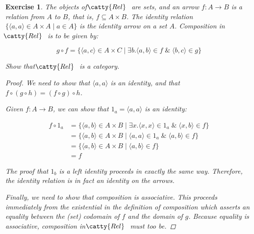 \documentclass[]{article}
\newtheorem{exercise}{Exercise}
\newcommand{\tfarr}[4][\to]{\ensuremath{#2 : #3 #1 #4}}
\newcommand{\cat}[1]{\ensuremath{\!\! \catty{#1} \,\,}}
\begin{document}
\begin{exercise}
  The objects of \cat{Rel} are sets, and an arrow \tfarr{f}{A}{B} is a relation
  from $A$ to $B$, that is, $f \subseteq A \times B$. The identity relation
  $\{\langle a, a\rangle \in A \times A \;|\; a \in A\}$ is the identity arrow
  on a set $A$.  Composition in \cat{Rel} is to be given by:

  $$
  g \circ f = \{\langle a, c\rangle \in A \times C \;|\; \exists b. \langle a,b
  \rangle \in f \;\&\; \langle b, c \rangle \in g\}
  $$

  Show that \cat{Rel} is a category.

  \begin{proof}
    We need to show that $\langle a, a\rangle$ is an identity, and that $f \circ
    (g \circ h) = (f \circ g) \circ h$.

    Given \tfarr{f}{A}{B}, we can show that $1_a = \langle a, a \rangle$ is an
    identity:

    \begin{align*}
      f \circ 1_a &=
  \{\langle a, b\rangle \in A \times B \;|\; \exists x. \langle x,x
  \rangle \in 1_a \;\&\; \langle x, b \rangle \in f\} \\
      &= \{\langle a, b\rangle \in A \times B \;|\; \langle a,a
  \rangle \in 1_a \;\&\; \langle a, b \rangle \in f\} \\
      &= \{\langle a, b\rangle \in A \times B \;|\;
  \langle a, b \rangle \in f\} \\
      &= f
    \end{align*}

    The proof that $1_b$ is a left identity proceeds in exactly the same way.
    Therefore, the identity relation is in fact an identity on the arrows.

    Finally, we need to show that composition is associative. This proceeds
    immediately from the existential in the definition of composition which
    asserts an equality between the (set) codomain of $f$ and the domain of $g$.
    Because equality is associative, composition in \cat{Rel} must too be.
  \end{proof}
\end{exercise}
\end{document}

